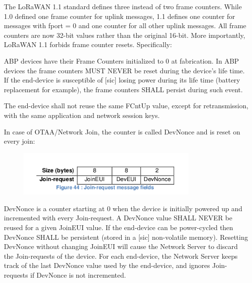 {The LoRaWAN 1.1 standard defines three instead of two frame counters. While
1.0 defined one frame counter for uplink messages, 1.1 defines one
counter for messages with fport = 0 and one counter for all other uplink
messages. All frame counters are now 32-bit values rather than the original 16-bit. More importantly, LoRaWAN 1.1 forbids frame counter resets. Specifically:

\begin{displayquote}
ABP devices have their Frame Counters initialized to 0 at
fabrication. In ABP devices the frame counters MUST NEVER be reset during the device's life time. If
the end-device is susceptible of [sic] losing power during its life time (battery replacement
for example), the frame counters SHALL persist during such event.
\end{displayquote}

\begin{displayquote}
The end-device shall not reuse the same FCntUp value, except for
retransmission, with the same application and network session keys.
\end{displayquote}

In case of OTAA/Network Join, the counter is called DevNonce and is
reset on every join:

\begin{figure}[h!]
{\includegraphics[width=0.8\textwidth]{images/image24.png}}
\end{figure}

\begin{displayquote}
DevNonce is a counter starting at 0 when the device is initially
powered up and incremented with every Join-request. A DevNonce value SHALL NEVER be reused for a
given JoinEUI value. If the end-device can be power-cycled then DevNonce SHALL be
persistent (stored in a [sic] non-volatile memory). Resetting DevNonce without changing JoinEUI
will cause the Network Server to discard the Join-requests of the device. For each
end-device, the Network Server keeps track of the last DevNonce value used by the
end-device, and ignores Join-requests if DevNonce is not incremented.
\end{displayquote}

}
